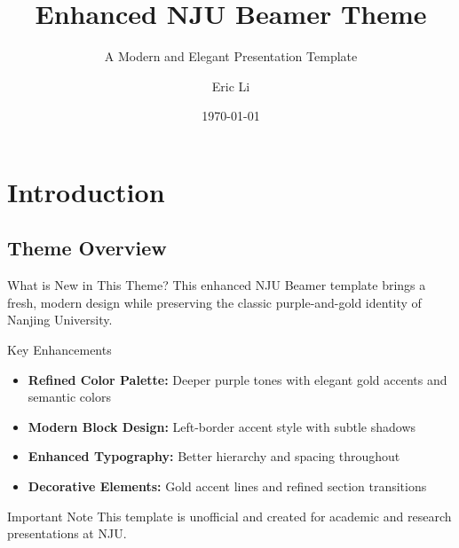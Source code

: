 \documentclass{ctexbeamer}
\title[Enhanced NJU Theme]{Enhanced NJU Beamer Theme}
\subtitle{A Modern and Elegant Presentation Template}
\author[Li]{Eric Li}
\institute{School of Artificial Intelligence, Nanjing University}
\date{\today}
\begin{document}
\maketitle

\section{Introduction}

\subsection{Theme Overview}
\begin{frame}{What is New in This Theme?}
    This enhanced NJU Beamer template brings a fresh, modern design while preserving the classic purple-and-gold identity of Nanjing University.
    
    \begin{block}{Key Enhancements}
        \begin{itemize}
            \item \textbf{Refined Color Palette:} Deeper purple tones with elegant gold accents and semantic colors
            \item \textbf{Modern Block Design:} Left-border accent style with subtle shadows
            \item \textbf{Enhanced Typography:} Better hierarchy and spacing throughout
            \item \textbf{Decorative Elements:} Gold accent lines and refined section transitions
        \end{itemize}
    \end{block}
    
    \begin{alertblock}{Important Note}
        This template is unofficial and created for academic and research presentations at NJU.
    \end{alertblock}
\end{frame}
\end{document}
